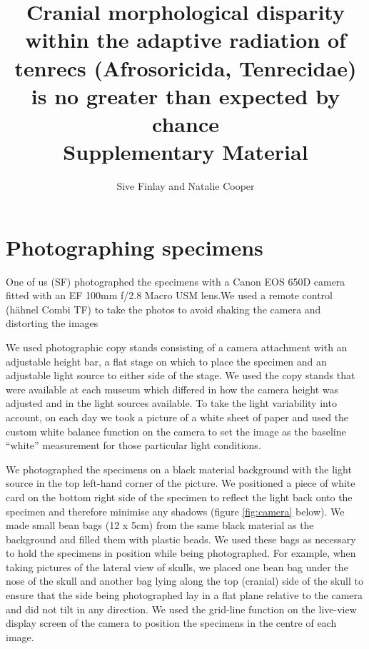 \documentclass[12pt,a4paper]{article}
\begin{document}
\title{
       Cranial morphological disparity within the adaptive radiation of tenrecs (Afrosoricida, Tenrecidae) is no greater than expected by chance\\
       \bigskip
       Supplementary Material }
\author{Sive Finlay and Natalie Cooper}
\date{}
\maketitle





\section{Photographing specimens}
One of us (SF) photographed the specimens with a Canon EOS 650D camera fitted with an EF 100mm f/2.8 Macro USM lens.We used a remote control (h\"ahnel Combi TF) to take the photos to avoid shaking the camera and distorting the images

We used photographic copy stands consisting of a camera attachment with an adjustable height bar, a flat stage on which to place the specimen and an adjustable light source to either side of the stage. We used the copy stands that were available at each museum which differed in how the camera height was adjusted and in the light sources available.
To take the light variability into account, on each day we took a picture of a white sheet of paper and used the custom white balance function on the camera to set the image as the baseline “white” measurement for those particular light conditions.

We photographed the specimens on a black material background with the light source in the top left-hand corner of the picture. We positioned a piece of white card on the bottom right side of the specimen to reflect the light back onto the specimen and therefore minimise any shadows (figure \ref{fig:camera} below).
We made small bean bags (12 x 5cm) from the same black material as the background and filled them with plastic beads. We used these bags as necessary to hold the specimens in position while being photographed. For example, when taking pictures of the lateral view of skulls, we placed one bean bag under the nose of the skull and another bag lying along the top (cranial) side of the skull to ensure that the side being photographed lay in a flat plane relative to the camera and did not tilt in any direction. 
We used the grid-line function on the live-view display screen of the camera to position the specimens in the centre of each image. 
\end{document}
